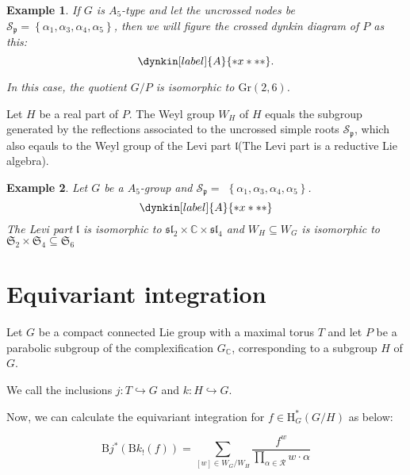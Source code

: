\documentclass[uplatex,dvipdfmx]{jsarticle}
\newtheorem{example}{Example}[section]
\begin{document}
\begin{example}
    If
    $G$
    is
    $A_5$-type
    and let the uncrossed nodes be
    $\mathcal{S}_{\mathfrak{p}} = \left\{ \alpha_1, \alpha_3, \alpha_4, \alpha_5 \right\}$,
    then we will figure the crossed dynkin diagram of
    $P$
    as this:
    \begin{equation}
        \dynkin[label]{A}{*x***}.
    \end{equation}

    In this case, the quotient
    $G/P$
    is isomorphic to
    $\mathrm{Gr}\left( 2, 6 \right)$.
\end{example}

Let
$H$
be a real part of
$P$.
The Weyl group 
$W_H$
of
$H$
equals the subgroup generated by the reflections associated to the uncrossed simple roots
$\mathcal{S}_\mathfrak{p}$,
which also eqauls to the Weyl group of the Levi part
$\mathfrak{l}$(The Levi part is a reductive Lie algebra).

\begin{example}
    Let 
    $G$ 
    be a 
    $A_5$-group
    and 
    $\mathcal{S}_{\mathfrak{p}} =$    
    $\left\{ \alpha_1, \alpha_3, \alpha_4, \alpha_5 \right\}$.
    \begin{equation*}
        \dynkin[label]{A}{*x***}
    \end{equation*}
    The Levi part
    $\mathfrak{l}$
    is isomorphic to
    $\mathfrak{sl}_2 \times \mathbb{C} \times \mathfrak{sl}_4$
    and
    $W_H \subseteq W_G$
    is isomorphic to
    $\mathfrak{S}_2 \times \mathfrak{S}_4 \subseteq \mathfrak{S}_6$
\end{example}


\section{Equivariant integration}

Let 
$G$ 
be a compact connected Lie group with a maximal torus
$T$
and let
$P$
be a parabolic subgroup of the complexification 
$G_{\mathbb{C}}$,
corresponding to a subgroup
$H$
of
$G$.

We call the inclusions
$j \colon T \hookrightarrow G$
and
$k \colon H \hookrightarrow G$.

Now, we can calculate the equivariant integration for 
$f \in \mathrm{H}^*_G(G/H)$ 
as below:

\begin{equation}
    \mathrm{B}j^*\left( 
        \mathrm{B}k_! \left( 
            f
        \right)
    \right)
    =
    \sum_{
        [w] \in W_G / W_H
    }
    \frac{f^w}{\prod_{\alpha \in \mathcal{R}} w \cdot \alpha}
\end{equation}
\end{document}
